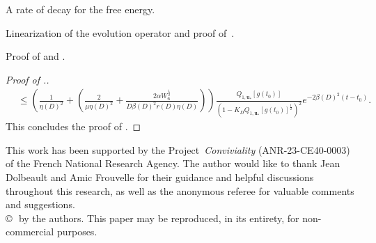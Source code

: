 \documentclass[reqno]{amsart} %
\begin{document}
\begin{section}{A rate of decay for the free energy.}
\begin{section}{Linearization of the evolution operator and proof of~\texorpdfstring{}{thm3}.}
\begin{subsection}{Proof of  \texorpdfstring{}{thme1} and \texorpdfstring{}{thm3}.}
\begin{proof}[Proof of .]
\begin{align*}
    &\leq \left(\frac{1}{ \eta(D)^2}+\left(\frac{2}{\mu \eta(D)^2}+\frac{ 2\alpha W_6^{\frac{1}{2}}}{D\beta(D)^2r(D)  \eta(D)} \right) \right) \frac{Q_{1,\mathbf{u}_*}[g(t_0)]}{\left(1-K_D Q_{1,\mathbf{u}_*}[g(t_0)]^{\frac{1}{2}}\right)^2} e^{-2\beta(D)^2(t-t_0)}.
\end{align*}
This concludes the proof of  .

\end{proof}
\end{subsection}
\end{section}
\bigskip{}
This work has been supported by the Project~\emph{Conviviality} (ANR-23-CE40-0003) of the French National Research Agency. The author would like to thank Jean Dolbeault and Amic Frouvelle for their guidance and helpful discussions throughout this research, as well as the anonymous referee for valuable comments and suggestions.\\[4pt]



{\scriptsize\copyright\,\the\year\ by the authors. This paper may be reproduced, in its entirety, for non-commercial purposes. }


         
             




\end{section}
\end{document}
